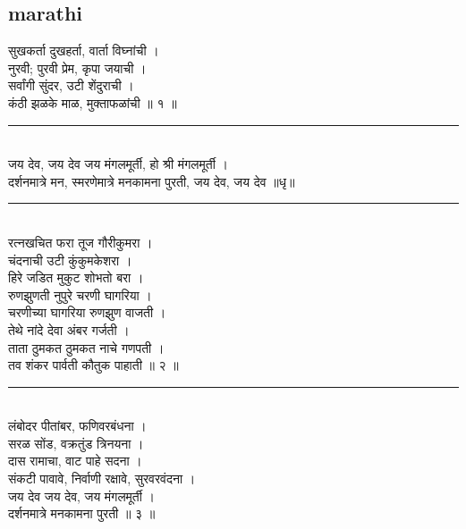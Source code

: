 \documentclass[letterpaper,twocolumn,openany,nodeprecatedcode]{dndbook}
\begin{document}
\subsection*{marathi}
\begin{flushleft}
  सुखकर्ता दुखहर्ता, वार्ता विघ्नांची । \\
  नुरवी; पुरवी प्रेम, कृपा जयाची ।\\
  सर्वांगी सुंदर, उटी शेंदुराची । \\
  कंठी झळके माळ, मुक्ताफळांची ॥ १ ॥ \\
  \rule{\linewidth}{1pt} \\
  जय देव, जय देव जय मंगलमूर्ती, हो श्री मंगलमूर्ती । \\
  दर्शनमात्रे मन, स्मरणेमात्रे मनकामना पुरती, जय देव, जय देव ॥धृ॥ \\
  \rule{\linewidth}{1pt} \\
  रत्नखचित फरा तूज गौरीकुमरा । \\
  चंदनाची उटी कुंकुमकेशरा । \\
  हिरे जडित मुकुट शोभतो बरा । \\
  रुणझुणती नुपुरे चरणी घागरिया । \\
  चरणीच्या घागरिया रुणझुण वाजती । \\
  तेथे नांदे देवा अंबर गर्जती । \\
  ताता ठुमकत ठुमकत नाचे गणपती । \\
  तव शंकर पार्वती कौतुक पाहाती ॥ २ ॥ \\
  \rule{\linewidth}{1pt} \\
  लंबोदर पीतांबर, फणिवरबंधना । \\
  सरळ सोंड, वक्रतुंड त्रिनयना । \\
  दास रामाचा, वाट पाहे सदना । \\
  संकटी पावावे, निर्वाणी रक्षावे, सुरवरवंदना । \\
  जय देव जय देव, जय मंगलमूर्ती । \\
  दर्शनमात्रे मनकामना पुरती ॥ ३ ॥
  \pagebreak

\end{flushleft}
\end{document}
